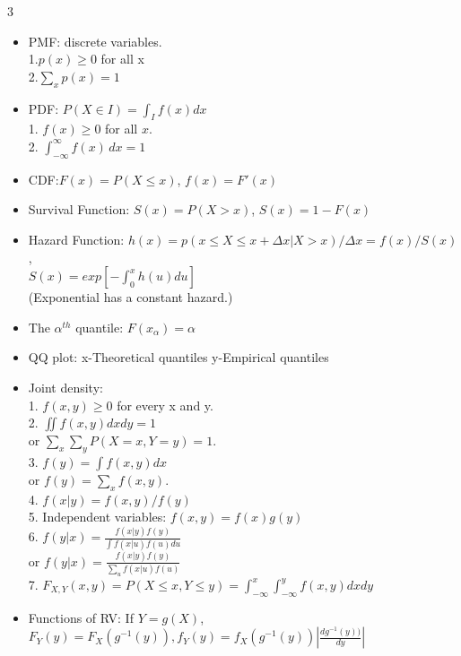 \documentclass[a4paper,10pt]{article}
\begin{document}
\begin{multicols}{3}
\begin{itemize}
    \item PMF: discrete variables. \\
    1.$p(x)\ge 0$ for all x\\
    2.$\sum_xp(x)=1$
    \item PDF: $P(X \in I)=\int_I f(x)dx$\\
    1. $f(x)\ge 0$ for all $x$. \\2. $\int_{-\infty}^\infty f(x)\,dx=1$
    \item CDF:$F(x)=P(X\le x)$,
    $f(x)=F'(x)$
    \item Survival Function: $S(x)=P(X>x)$,
    $S(x)=1-F(x)$
    \item Hazard Function: $h(x)=p(x\le X\le x+\Delta x|X>x)/\Delta x=f(x)/S(x)$,\\
    $S(x)=exp[-\int_0^xh(u)du]$\\
    (Exponential has a constant hazard.)
    \item The $\alpha^{th}$ quantile: $F(x_\alpha)=\alpha$
    \item QQ plot: x-Theoretical quantiles y-Empirical quantiles
    \item Joint density:\\ 1. $f(x,y)\ge 0$ for every x and y. \\2. $\iint f(x,y)dxdy=1$\\ or $\sum_x \sum_y P(X=x,Y=y)=1$.\\
    3. $f(y)=\int f(x,y)dx$\\ or $f(y)=\sum_x f(x,y)$.\\
    4. $f(x|y)=f(x,y)/f(y)$\\
    5. Independent variables: $f(x,y)=f(x)g(y)$\\
    6. $f(y|x)=\frac{f(x|y)f(y)}{\int f(x|u)f(u)du}$\\
    or $f(y|x)=\frac{f(x|y)f(y)}{\sum_u f(x|u)f(u)}$\\
    7. $F_{X,Y}(x,y)=P(X\le x,Y\le y)=\int_{-\infty}^x \int_{-\infty}^yf(x,y)dxdy$
    \item Functions of RV: If $Y=g(X)$, $F_Y(y)=F_X(g^{-1}(y)),f_Y(y)=f_X(g^{-1}(y))|\frac{dg^{-1}(y))}{dy}|$
\end{itemize}


\end{multicols}
\end{document}
